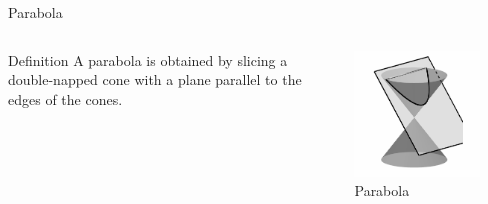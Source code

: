 \documentclass[14pt,aspectratio=169]{beamer}
\begin{document}
\begin{frame}{Parabola}
 \begin{columns}
          \begin{block}{Definition}
      A parabola is obtained by slicing a double-napped cone with a plane parallel to the edges of the cones.
     \end{block}
      \centering
        \includegraphics[width=0.8\textwidth]{image09.png}\\Parabola

    \end{columns}

\end{frame}
\end{document}

